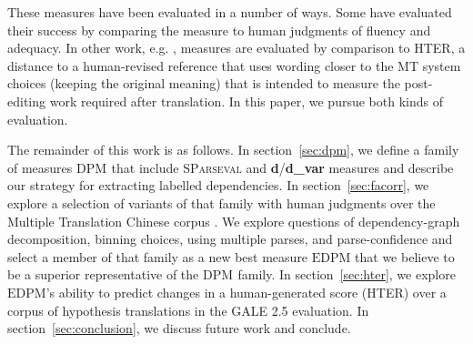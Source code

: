 \documentclass[11pt]{article}
\newcommand{\DPM}[1]{\ensuremath{\mathrm{DPM}_{#1}}}
\newcommand{\myEDPM}[0]{\ensuremath{\mathrm{EDPM}}}
\begin{document}


These measures have been evaluated in a number of ways.  Some
\cite{banerjee05meteor,liu05syntaxformteval,owczarzak07labelleddepseval}
have evaluated their success by comparing the measure to human
judgments of fluency and adequacy.  In other work,
e.g. , 
measures are evaluated by comparison to
HTER, a distance to a human-revised reference that uses wording closer
to the MT system choices (keeping the original meaning) that
is intended to measure the post-editing work required after
translation.  In this paper, we pursue both kinds of evaluation.

The remainder of this work is as follows. In section~\ref{sec:dpm}, we
define a family of measures \DPM{} that include \textsc{SParseval} and
\textbf{d}/\textbf{d\_var} measures and describe our strategy for
extracting labelled dependencies. In section~\ref{sec:facorr}, we
explore a selection of variants of that family with human judgments
over the Multiple Translation Chinese corpus
\cite{LDC03MTC2,LDC06MTC4}. We explore questions of dependency-graph
decomposition, binning choices, using multiple parses, and
parse-confidence and select a member of that family as a new best
measure \myEDPM{} that we believe to be a superior representative of
the \DPM{} family.  In section~\ref{sec:hter}, we explore \myEDPM{}'s
ability to predict changes in a human-generated score (HTER) over a
corpus of hypothesis translations in the GALE 2.5 \cite{darpa08gale}
evaluation. In section~\ref{sec:conclusion}, we discuss future work
and conclude.

\end{document}

